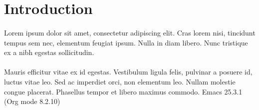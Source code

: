 

\maketitle
\tableofcontents


\section{Introduction}
\label{sec:org879b81a}

\paragraph{}
Lorem ipsum dolor sit amet, consectetur adipiscing elit. Cras lorem
nisi, tincidunt tempus sem nec, elementum feugiat ipsum. Nulla in
diam libero. Nunc tristique ex a nibh egestas sollicitudin.

\paragraph{}
Mauris efficitur vitae ex id egestas. Vestibulum ligula felis,
pulvinar a posuere id, luctus vitae leo. Sed ac imperdiet orci, non
elementum leo. Nullam molestie congue placerat. Phasellus tempor et
libero maximus commodo.
Emacs 25.3.1 (Org mode 8.2.10)

